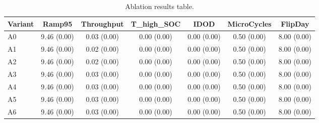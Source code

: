 \begin{table}[t]
\centering
\caption{Ablation results table.}
\label{tab:ablation_auto}
\begin{tabular}{lcccccc}
\toprule
Variant & Ramp95 & Throughput & T\_high\_SOC & IDOD & MicroCycles & FlipDay \\
\midrule
A0 & 9.46 (0.00) & 0.03 (0.00) & 0.00 (0.00) & 0.00 (0.00) & 0.50 (0.00) & 8.00 (0.00) \\
A1 & 9.46 (0.00) & 0.02 (0.00) & 0.00 (0.00) & 0.00 (0.00) & 0.50 (0.00) & 8.00 (0.00) \\
A2 & 9.46 (0.00) & 0.02 (0.00) & 0.00 (0.00) & 0.00 (0.00) & 0.50 (0.00) & 8.00 (0.00) \\
A3 & 9.46 (0.00) & 0.03 (0.00) & 0.00 (0.00) & 0.00 (0.00) & 0.50 (0.00) & 8.00 (0.00) \\
A4 & 9.46 (0.00) & 0.03 (0.00) & 0.00 (0.00) & 0.00 (0.00) & 0.50 (0.00) & 8.00 (0.00) \\
A5 & 9.46 (0.00) & 0.03 (0.00) & 0.00 (0.00) & 0.00 (0.00) & 0.50 (0.00) & 8.00 (0.00) \\
A6 & 9.46 (0.00) & 0.03 (0.00) & 0.00 (0.00) & 0.00 (0.00) & 0.50 (0.00) & 8.00 (0.00) \\
\bottomrule
\end{tabular}
\end{table}